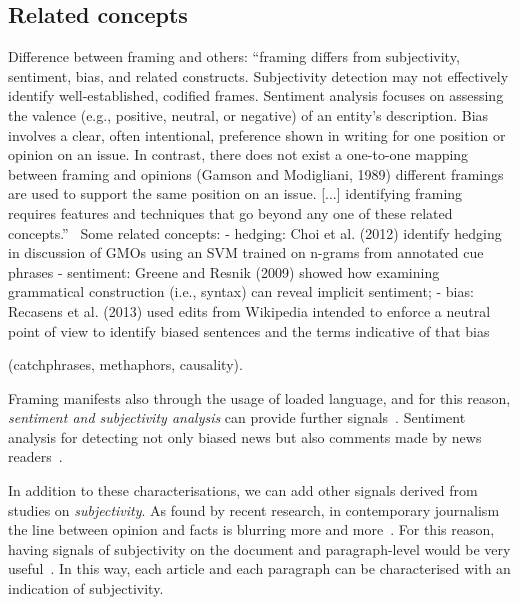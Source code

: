 

\subsection{Related concepts}
\label{ssec:lit_framing_other}

Difference between framing and others:
``framing differs from subjectivity, sentiment, bias, and related constructs. Subjectivity detection may not effectively identify well-established,
codified frames.
Sentiment analysis focuses on assessing the valence
(e.g., positive, neutral, or negative) of an entity’s description. Bias involves a clear, often intentional,
preference shown in writing for one position or opinion on an issue. In contrast, there does not exist
a one-to-one mapping between framing and opinions (Gamson and Modigliani, 1989)
different framings are used to support the same position on an issue. [...] identifying framing requires features and techniques that
go beyond any one of these related concepts.''~\cite{baumer2015testing}
Some related concepts:
- hedging: Choi et al. (2012) identify hedging in discussion of GMOs using an SVM trained on n-grams from annotated cue phrases
- sentiment: Greene and Resnik (2009) showed how examining grammatical construction (i.e., syntax) can reveal implicit sentiment;
- bias: Recasens et al. (2013) used edits from Wikipedia intended to enforce a neutral point of view to identify biased sentences and the terms indicative of that bias


\cite{mandal2017overview,gao2018neural,asghar2016automatic} (catchphrases, methaphors, causality).

Framing manifests also through the usage of loaded language, and for this reason, \textit{sentiment and subjectivity analysis} can provide further signals~\cite{liu2010sentiment}.
Sentiment analysis for detecting not only biased news but also comments made by news readers~\cite{park2011politics}.


In addition to these characterisations, we can add other signals derived from studies on \emph{subjectivity}.
As found by recent research, in contemporary journalism the line between opinion and facts is blurring more and more~\cite{blake2019news}. For this reason, having signals of subjectivity on the document and paragraph-level would be very useful~\cite{liu2010sentiment}.
In this way, each article and each paragraph can be characterised with an indication of subjectivity.

